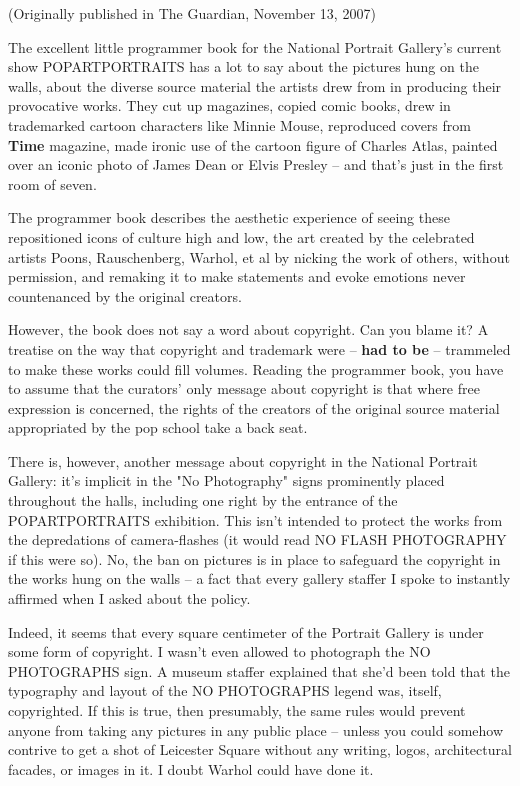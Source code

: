 (Originally published in The Guardian, November 13, 2007)

The excellent little programmer book for the National Portrait
Gallery's current show POPARTPORTRAITS has a lot to say about the
pictures hung on the walls, about the diverse source material the
artists drew from in producing their provocative works. They cut up
magazines, copied comic books, drew in trademarked cartoon
characters like Minnie Mouse, reproduced covers from \textbf{Time}
magazine, made ironic use of the cartoon figure of Charles Atlas,
painted over an iconic photo of James Dean or Elvis Presley -- and
that's just in the first room of seven.

The programmer book describes the aesthetic experience of seeing
these repositioned icons of culture high and low, the art created
by the celebrated artists Poons, Rauschenberg, Warhol, et al by
nicking the work of others, without permission, and remaking it to
make statements and evoke emotions never countenanced by the
original creators.

However, the book does not say a word about copyright. Can you
blame it? A treatise on the way that copyright and trademark were
-- \textbf{had to be} -- trammeled to make these works could fill
volumes. Reading the programmer book, you have to assume that the
curators' only message about copyright is that where free
expression is concerned, the rights of the creators of the original
source material appropriated by the pop school take a back seat.

There is, however, another message about copyright in the National
Portrait Gallery: it's implicit in the "No Photography" signs
prominently placed throughout the halls, including one right by the
entrance of the POPARTPORTRAITS exhibition. This isn't intended to
protect the works from the depredations of camera-flashes (it would
read NO FLASH PHOTOGRAPHY if this were so). No, the ban on pictures
is in place to safeguard the copyright in the works hung on the
walls -- a fact that every gallery staffer I spoke to instantly
affirmed when I asked about the policy.

Indeed, it seems that every square centimeter of the Portrait
Gallery is under some form of copyright. I wasn't even allowed to
photograph the NO PHOTOGRAPHS sign. A museum staffer explained that
she'd been told that the typography and layout of the NO
PHOTOGRAPHS legend was, itself, copyrighted. If this is true, then
presumably, the same rules would prevent anyone from taking any
pictures in any public place -- unless you could somehow contrive
to get a shot of Leicester Square without any writing, logos,
architectural facades, or images in it. I doubt Warhol could have
done it.

